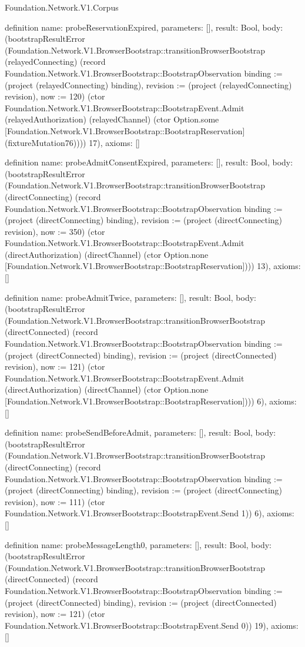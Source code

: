 \begin{lexlean}{Foundation.Network.V1.Corpus}
\begin{semanticmodule}
definition{
  name: probeReservationExpired,
  parameters: [],
  result: Bool,
  body: (bootstrapResultError (Foundation.Network.V1.BrowserBootstrap::transitionBrowserBootstrap (relayedConnecting) (record Foundation.Network.V1.BrowserBootstrap::BootstrapObservation {binding := (project (relayedConnecting) binding), revision := (project (relayedConnecting) revision), now := 120}) (ctor Foundation.Network.V1.BrowserBootstrap::BootstrapEvent.Admit (relayedAuthorization) (relayedChannel) (ctor Option.some [Foundation.Network.V1.BrowserBootstrap::BootstrapReservation] (fixtureMutation76)))) 17),
  axioms: []
}

definition{
  name: probeAdmitConsentExpired,
  parameters: [],
  result: Bool,
  body: (bootstrapResultError (Foundation.Network.V1.BrowserBootstrap::transitionBrowserBootstrap (directConnecting) (record Foundation.Network.V1.BrowserBootstrap::BootstrapObservation {binding := (project (directConnecting) binding), revision := (project (directConnecting) revision), now := 350}) (ctor Foundation.Network.V1.BrowserBootstrap::BootstrapEvent.Admit (directAuthorization) (directChannel) (ctor Option.none [Foundation.Network.V1.BrowserBootstrap::BootstrapReservation]))) 13),
  axioms: []
}

definition{
  name: probeAdmitTwice,
  parameters: [],
  result: Bool,
  body: (bootstrapResultError (Foundation.Network.V1.BrowserBootstrap::transitionBrowserBootstrap (directConnected) (record Foundation.Network.V1.BrowserBootstrap::BootstrapObservation {binding := (project (directConnected) binding), revision := (project (directConnected) revision), now := 121}) (ctor Foundation.Network.V1.BrowserBootstrap::BootstrapEvent.Admit (directAuthorization) (directChannel) (ctor Option.none [Foundation.Network.V1.BrowserBootstrap::BootstrapReservation]))) 6),
  axioms: []
}

definition{
  name: probeSendBeforeAdmit,
  parameters: [],
  result: Bool,
  body: (bootstrapResultError (Foundation.Network.V1.BrowserBootstrap::transitionBrowserBootstrap (directConnecting) (record Foundation.Network.V1.BrowserBootstrap::BootstrapObservation {binding := (project (directConnecting) binding), revision := (project (directConnecting) revision), now := 111}) (ctor Foundation.Network.V1.BrowserBootstrap::BootstrapEvent.Send 1)) 6),
  axioms: []
}

definition{
  name: probeMessageLength0,
  parameters: [],
  result: Bool,
  body: (bootstrapResultError (Foundation.Network.V1.BrowserBootstrap::transitionBrowserBootstrap (directConnected) (record Foundation.Network.V1.BrowserBootstrap::BootstrapObservation {binding := (project (directConnected) binding), revision := (project (directConnected) revision), now := 121}) (ctor Foundation.Network.V1.BrowserBootstrap::BootstrapEvent.Send 0)) 19),
  axioms: []
}


\end{semanticmodule}
\end{lexlean}
